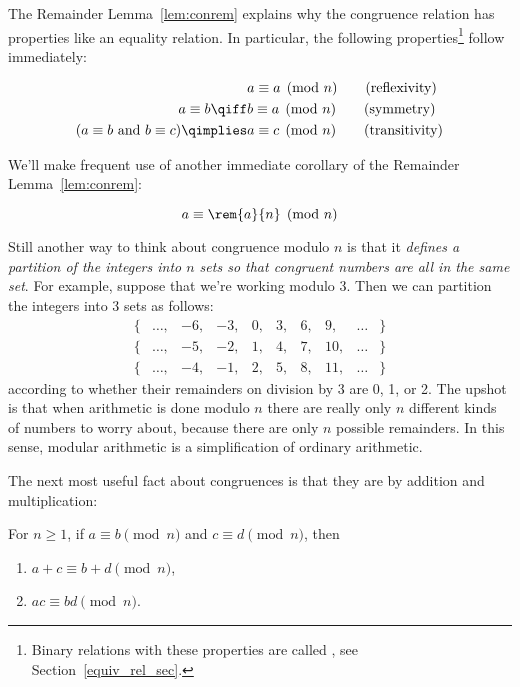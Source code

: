 The Remainder Lemma~\ref{lem:conrem} explains why the congruence
relation has properties like an equality relation.  In particular, the
following properties\footnote{Binary relations with these properties
  are called \emph{}, see
  Section~\ref{equiv_rel_sec}.}  follow immediately:
\begin{lemma}\label{mod_equiv_rel_lem} \mbox{}
\begin{align}
                 & a \equiv a \pmod{n}\tag{reflexivity}\\ a \equiv b
  \qiff & b \equiv a \pmod{n} \tag{symmetry}\\ (a \equiv b \text{ and
  } b \equiv c) \qimplies & a \equiv c \pmod{n} \tag{transitivity}
\end{align}
\end{lemma}

We'll make frequent use of another immediate corollary of the
Remainder Lemma~\ref{lem:conrem}:
\begin{corollary}\label{aran}
\[
a \equiv \rem{a}{n} \pmod{n}
\]
\end{corollary}

Still another way to think about congruence modulo $n$ is that it
\emph{defines a partition of the integers into $n$ sets so that
  congruent numbers are all in the same set}.  For example, suppose
that we're working modulo 3.  Then we can partition the integers into
3 sets as follows:
\[
\begin{array}{cccccccccc}
\{ & \dots, & -6, & -3, & 0, & 3, & 6, & 9, & \dots & \} \\ \{ &
\dots, & -5, & -2, & 1, & 4, & 7, & 10, & \dots & \} \\ \{ & \dots, &
-4, & -1, & 2, & 5, & 8, & 11, & \dots & \}
\end{array}
\]
according to whether their remainders on division by 3 are 0, 1, or 2.
The upshot is that when arithmetic is done modulo $n$ there are really
only $n$ different kinds of numbers to worry about, because there are
only $n$ possible remainders.  In this sense, modular arithmetic is a
simplification of ordinary arithmetic.\iffalse and thus is a good
reasoning tool.\fi

The next most useful fact about congruences is that they are
 by addition and multiplication:

\begin{lemma}[Congruence]\label{mod_congruence_lem} For $n \geq 1$, if
$a \equiv b \pmod{n}$ and $c \equiv d \pmod{n}$, then
\begin{enumerate}
\item $a + c \equiv b + d \pmod{n}$,\label{mod_congruence_lem+}
\item $a c \equiv b d \pmod{n}$.\label{mod_congruence_lem*}
\end{enumerate}
\end{lemma}

